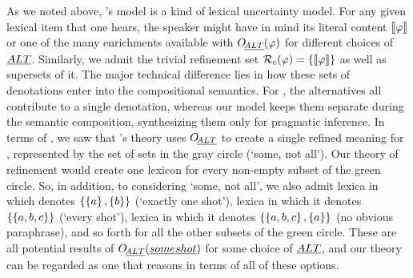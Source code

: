\documentclass[leqno]{article}
\begin{document}
As we noted above, \CFS's model is a kind of lexical uncertainty
model. For any given lexical item that one hears, the speaker might
have in mind its literal content $\llbracket\varphi\rrbracket$ or one of the many
enrichments available with $\mathop{O\negthinspace_{\emph{ALT}}}(\varphi)$ for different choices of
$\emph{ALT}$. Similarly, we admit the trivial refinement set
$\mathcal{R}_{c}(\varphi) = \left\{ \llbracket\varphi\rrbracket \right\}$ as well as supersets of
it. The major technical difference lies in how these sets of
denotations enter into the compositional semantics. For \CFS, the
alternatives all contribute to a single denotation, whereas our model
keeps them separate during the semantic composition, synthesizing them
only for pragmatic inference. In terms of , we saw
that \CFS's theory uses $\mathop{O\negthinspace_{\emph{ALT}}}$ to create a single refined meaning for
, represented by the set of sets in the gray circle
(`some, not all'). Our theory of refinement would create one lexicon
for every non-empty subset of the green circle. So, in addition, to
considering `some, not all', we also admit lexica in which  denotes $\left\{ \left\{ a \right\}, \left\{ b \right\} \right\}$ (`exactly one shot'),
lexica in which it denotes $\left\{ \left\{ a,b,c \right\} \right\}$ (`every shot'), lexica
in which it denotes $\left\{ \left\{ a,b,c \right\},\left\{ a \right\} \right\}$ (no obvious
paraphrase), and so forth for all the other subsets of the green
circle. These are all potential results of $\mathop{O\negthinspace_{\emph{ALT}}}(\emph{some shot})$
for some choice of $\emph{ALT}$, and our theory can be regarded as one that
reasons in terms of all of these options.
\end{document}
